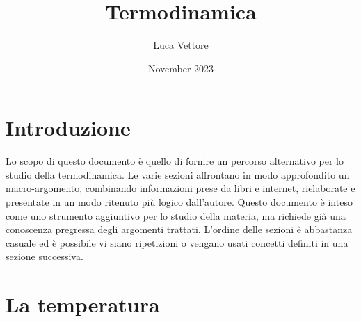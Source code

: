 \documentclass{article}
\title{Termodinamica}
\author{Luca Vettore}
\date{November 2023}
\begin{document}


\maketitle

\section{Introduzione}
Lo scopo di questo documento è quello di fornire un percorso alternativo per lo studio della termodinamica. Le varie sezioni affrontano in modo approfondito un macro-argomento, combinando informazioni prese da libri e internet, rielaborate e presentate in un modo ritenuto più logico dall'autore. Questo documento è inteso come uno strumento aggiuntivo per lo studio della materia, ma richiede già una conoscenza pregressa degli argomenti trattati. L'ordine delle sezioni è abbastanza casuale ed è possibile vi siano ripetizioni o vengano usati concetti definiti in una sezione successiva.





\section{La temperatura}
\end{document}
